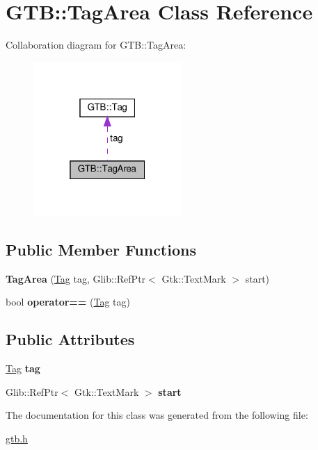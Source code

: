 \hypertarget{a00032}{}\section{G\+TB\+:\+:Tag\+Area Class Reference}
\label{a00032}


Collaboration diagram for G\+TB\+:\+:Tag\+Area\+:\nopagebreak
\begin{figure}[H]
\begin{center}
\leavevmode
\includegraphics[width=160pt]{a00030}
\end{center}
\end{figure}
\subsection*{Public Member Functions}
\begin{DoxyCompactItemize}
\item 
\mbox{\label{a00032_a0454486ec9cbb9734c59471719a3d071}} 
{\bfseries Tag\+Area} (\hyperlink{a00028}{Tag} tag, Glib\+::\+Ref\+Ptr$<$ Gtk\+::\+Text\+Mark $>$ start)
\item 
\mbox{\label{a00032_a60b193884237e460dccde4f45ad4d088}} 
bool {\bfseries operator==} (\hyperlink{a00028}{Tag} tag)
\end{DoxyCompactItemize}
\subsection*{Public Attributes}
\begin{DoxyCompactItemize}
\item 
\mbox{\label{a00032_abc21113af3169babd1942ea0dca0977a}} 
\hyperlink{a00028}{Tag} {\bfseries tag}
\item 
\mbox{\label{a00032_a1400795c4c72f6e179471216afd17a3f}} 
Glib\+::\+Ref\+Ptr$<$ Gtk\+::\+Text\+Mark $>$ {\bfseries start}
\end{DoxyCompactItemize}


The documentation for this class was generated from the following file\+:\begin{DoxyCompactItemize}
\item 
\hyperlink{a00005}{gtb.\+h}\end{DoxyCompactItemize}

